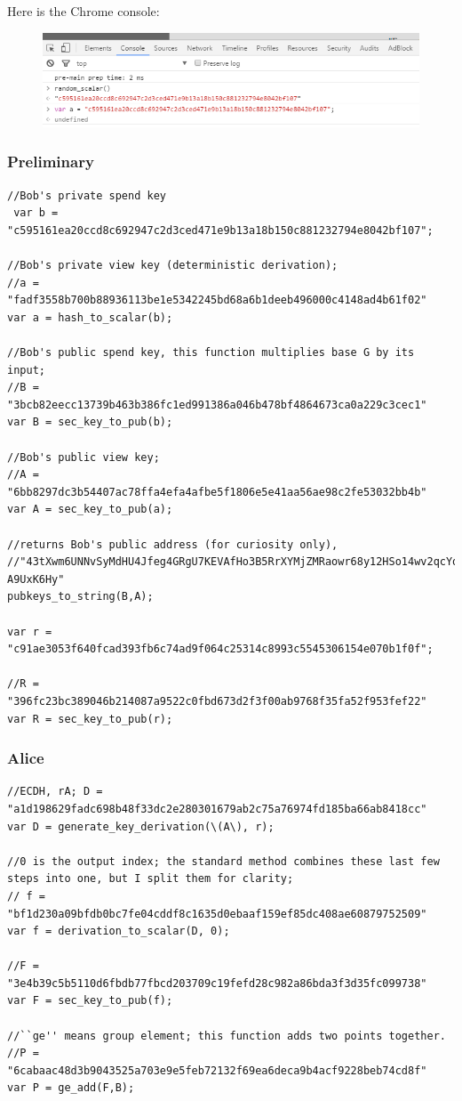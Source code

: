 Here is the Chrome console:
\begin{figure}[H]
	\centering
	\includegraphics[width=0.8\linewidth]{./images/blog-series/xmr-crypto-luigi1111/stealth-address-chrome-console.png}
\end{figure}

\subsubsection{Preliminary}
\begin{lstlisting}
//Bob's private spend key
 var b = "c595161ea20ccd8c692947c2d3ced471e9b13a18b150c881232794e8042bf107"; 

//Bob's private view key (deterministic derivation); 
//a = "fadf3558b700b88936113be1e5342245bd68a6b1deeb496000c4148ad4b61f02"
var a = hash_to_scalar(b); 

//Bob's public spend key, this function multiplies base G by its input; 
//B = "3bcb82eecc13739b463b386fc1ed991386a046b478bf4864673ca0a229c3cec1"
var B = sec_key_to_pub(b); 

//Bob's public view key; 
//A = "6bb8297dc3b54407ac78ffa4efa4afbe5f1806e5e41aa56ae98c2fe53032bb4b"
var A = sec_key_to_pub(a); 

//returns Bob's public address (for curiosity only), 
//"43tXwm6UNNvSyMdHU4Jfeg4GRgU7KEVAfHo3B5RrXYMjZMRaowr68y12HSo14wv2qcYqqpG1U5AHrJtBdFHKPDE A9UxK6Hy"
pubkeys_to_string(B,A); 

var r = "c91ae3053f640fcad393fb6c74ad9f064c25314c8993c5545306154e070b1f0f";

//R = "396fc23bc389046b214087a9522c0fbd673d2f3f00ab9768f35fa52f953fef22"
var R = sec_key_to_pub(r); 
\end{lstlisting}
\subsubsection{Alice}
\begin{lstlisting}
//ECDH, rA; D = "a1d198629fadc698b48f33dc2e280301679ab2c75a76974fd185ba66ab8418cc"
var D = generate_key_derivation(\(A\), r); 

//0 is the output index; the standard method combines these last few steps into one, but I split them for clarity; 
// f = "bf1d230a09bfdb0bc7fe04cddf8c1635d0ebaaf159ef85dc408ae60879752509"
var f = derivation_to_scalar(D, 0); 

//F = "3e4b39c5b5110d6fbdb77fbcd203709c19fefd28c982a86bda3f3d35fc099738"
var F = sec_key_to_pub(f); 

//``ge'' means group element; this function adds two points together. 
//P = "6cabaac48d3b9043525a703e9e5feb72132f69ea6deca9b4acf9228beb74cd8f"
var P = ge_add(F,B); 
\end{lstlisting}
